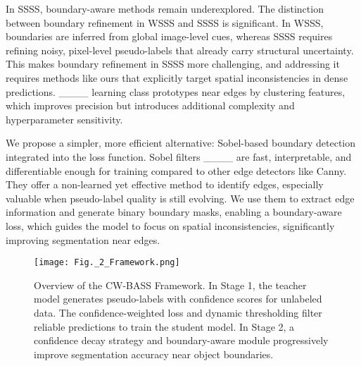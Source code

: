 In SSSS, boundary-aware methods remain underexplored. The distinction between boundary refinement in WSSS and SSSS is significant. In WSSS, boundaries are inferred from global image-level cues, whereas SSSS requires refining noisy, pixel-level pseudo-labels that already carry structural uncertainty. This makes boundary refinement in SSSS more challenging, and addressing it requires methods like ours that explicitly target spatial inconsistencies in dense predictions. ____ learning class prototypes near edges by clustering features, which improves precision but introduces additional complexity and hyperparameter sensitivity.

We propose a simpler, more efficient alternative: Sobel-based boundary detection integrated into the loss function. Sobel filters ____ are fast, interpretable, and differentiable enough for training compared to other edge detectors like Canny. They offer a non-learned yet effective method to identify edges, especially valuable when pseudo-label quality is still evolving. We use them to extract edge information and generate binary boundary masks, enabling a boundary-aware loss, which guides the model to focus on spatial inconsistencies, significantly improving segmentation near edges.


\begin{figure*}[ht]
\centering
\texttt{[image: Fig.\_2\_Framework.png]}
\caption{Overview of the CW-BASS Framework. In Stage 1, the teacher model generates pseudo-labels with confidence scores for unlabeled data. The confidence-weighted loss and dynamic thresholding filter reliable predictions to train the student model. In Stage 2, a confidence decay strategy and boundary-aware module progressively improve segmentation accuracy near object boundaries.}
\label{Fig._2_Framework.png}
\end{figure*}